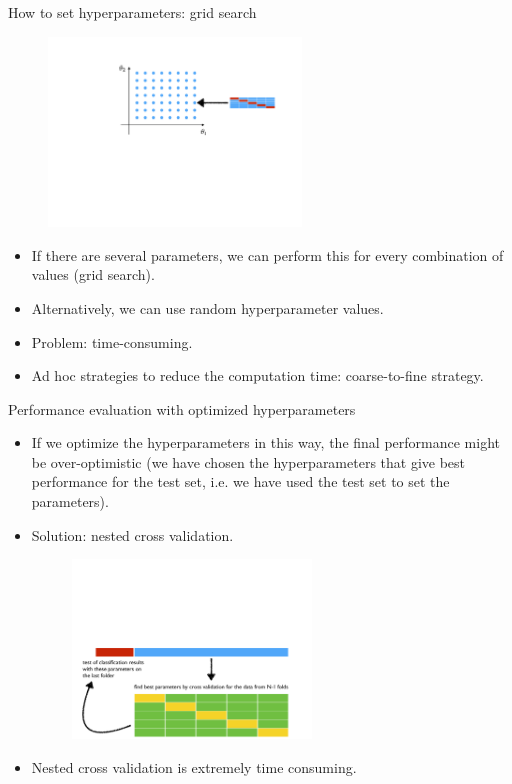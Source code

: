 \documentclass[xcolor=pdftex,dvipsnames,table]{beamer}
\begin{document}
\begin{frame}{How to set hyperparameters: grid search}
	\begin{figure}[htb]
		\includegraphics[width=0.6\textwidth]{../graphics/CV2.pdf}
	\end{figure}
	\begin{itemize}
		\item If there are several parameters, we can perform this for every combination of values (grid search).
		\item Alternatively, we can use random hyperparameter values.
		\item Problem: time-consuming.
		\item Ad hoc strategies to reduce the computation time: coarse-to-fine strategy.
	\end{itemize}
\end{frame}

\begin{frame}{Performance evaluation with optimized hyperparameters}
	\begin{itemize}
		\item<1-> If we optimize the hyperparameters in this way, the final performance might be over-optimistic (we have chosen the hyperparameters that give best performance for the test set, i.e. we have used the test set to set the parameters).
		\item<2-> Solution: nested cross validation.
		\begin{figure}[htb]
			\includegraphics[width=0.6\textwidth]{../graphics/CV3.pdf}
		\end{figure}
		\item<3-> Nested cross validation is extremely time consuming.
	\end{itemize}
\end{frame}
\end{document}
